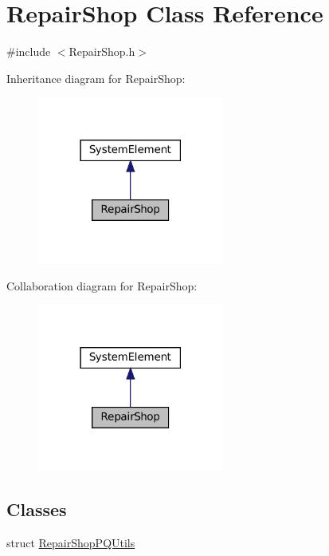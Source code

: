 \hypertarget{classRepairShop}{}\section{Repair\+Shop Class Reference}
\label{classRepairShop}


{\ttfamily \#include $<$Repair\+Shop.\+h$>$}



Inheritance diagram for Repair\+Shop\+:
\nopagebreak
\begin{figure}[H]
\begin{center}
\leavevmode
\includegraphics[width=174pt]{classRepairShop__inherit__graph}
\end{center}
\end{figure}


Collaboration diagram for Repair\+Shop\+:
\nopagebreak
\begin{figure}[H]
\begin{center}
\leavevmode
\includegraphics[width=174pt]{classRepairShop__coll__graph}
\end{center}
\end{figure}
\subsection*{Classes}
\begin{DoxyCompactItemize}
\item 
struct \mbox{\hyperlink{structRepairShop_1_1RepairShopPQUtils}{Repair\+Shop\+P\+Q\+Utils}}
\end{DoxyCompactItemize}

